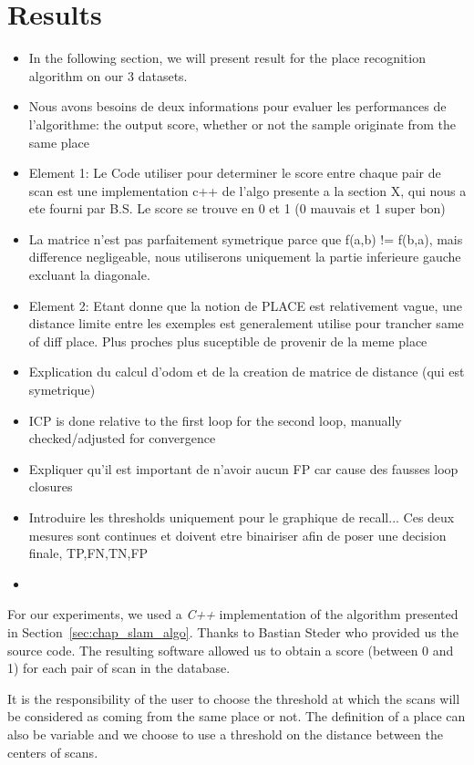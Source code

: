 \section{Results}
\label{sec:chap_slam_results}

\begin{itemize}
    \item In the following section, we will present result for the place recognition algorithm on our 3 datasets.
    \item Nous avons besoins de deux informations pour evaluer les performances de l'algorithme: the output score, whether or not the sample originate from the same place
    \item Element 1: Le Code utiliser pour determiner le score entre chaque pair de scan est une implementation c++ de l'algo presente a la section X, qui nous a ete fourni par B.S. Le score se trouve en 0 et 1 (0 mauvais et 1 super bon)
    \item La matrice n'est pas parfaitement symetrique parce que f(a,b) != f(b,a), mais difference negligeable, nous utiliserons uniquement la partie inferieure gauche excluant la diagonale.
    \item Element 2: Etant donne que la notion de PLACE est relativement vague, une distance limite entre les exemples est generalement utilise pour trancher same of diff place. Plus proches plus suceptible de provenir de la meme place
    \item Explication du calcul d'odom et de la creation de matrice de distance (qui est symetrique)
    \item ICP is done relative to the first loop for the second loop, manually checked/adjusted for convergence
    \item Expliquer qu'il est important de n'avoir aucun FP car cause des fausses loop closures
    \item Introduire les thresholds uniquement pour le graphique de recall... Ces deux mesures sont continues et doivent etre binairiser afin de poser une decision finale, TP,FN,TN,FP
    \item 
\end{itemize}
For our experiments, we used a \textit{C++} implementation of the algorithm presented in Section~\ref{sec:chap_slam_algo}. Thanks to Bastian Steder who provided us the source code. The resulting software allowed us to obtain a score (between 0 and 1) for each pair of scan in the database. 

It is the responsibility of the user to choose the threshold at which the scans will be considered as coming from the same place or not. The definition of a place can also be variable and we choose to use a threshold on the distance between the centers of scans. 

